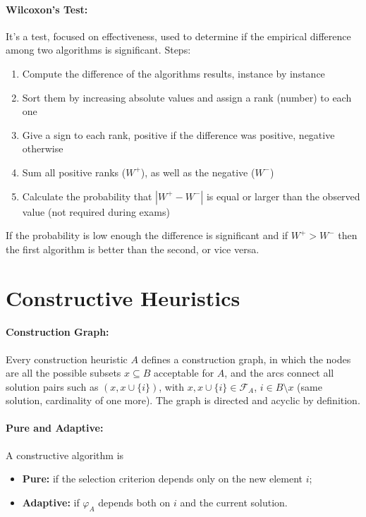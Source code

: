 \documentclass{article}
\begin{document}
	\paragraph{Wilcoxon's Test:} It's a test, focused on effectiveness, used to determine if the empirical difference among two algorithms is significant. Steps:
	\begin{enumerate}
		\item Compute the difference of the algorithms results, instance by instance
		\item Sort them by increasing absolute values and assign a rank (number) to each one
		\item Give a sign to each rank, positive if the difference was positive, negative otherwise
		\item Sum all positive ranks ($W^+$), as well as the negative ($W^-$)
		\item Calculate the probability that $|W^+ - W^-|$ is equal or larger than the observed value (not required during exams)
	\end{enumerate}
	If the probability is low enough the difference is significant and if $W^+ > W^-$ then the first algorithm is better than the second, or vice versa.\\
	
	\section*{Constructive Heuristics}
	
	\paragraph{Construction Graph:} Every construction heuristic $A$ defines a construction graph, in which the nodes are all the possible subsets $x \subseteq B$ acceptable for $A$, and the arcs connect all solution pairs such as $(x, x \cup \{i\})$, with $x, x \cup \{i\} \in \mathcal{F}_A$, $i \in B \setminus x$ (same solution, cardinality of one more). The graph is directed and acyclic by definition.\\
	
	\paragraph{Pure and Adaptive:} A constructive algorithm is 
	\begin{itemize}
		\item \textbf{Pure:} if the selection criterion depends only on the new element $i$;
		\item \textbf{Adaptive:} if $\varphi_A$ depends both on $i$ and the current solution.\\
	\end{itemize}
	
\end{document}
